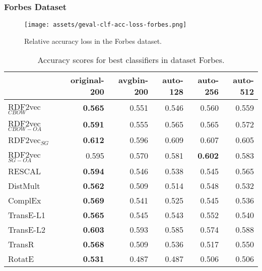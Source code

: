 \documentclass[11pt,titlepage,oneside,openany]{book}
\begin{document}
\newpage

\subsubsection{Forbes Dataset}
\label{subsubsec:geval-results-clf-forbes}


\begin{figure}[H]
    \centering
    \texttt{[image: assets/geval-clf-acc-loss-forbes.png]}
    \vspace*{-3mm}
    \caption{Relative accuracy loss in the Forbes dataset.}
    \label{fig:geval-clf-acc-loss-forbes}
\end{figure}


\begin{table}[H]
\centering
\begin{tabular}{lrrrrr}
\toprule
{} &  original-200 &  avgbin-200 &  auto-128 &  auto-256 &  auto-512 \\
\midrule
RDF2vec$_{CBOW}$     &	\textbf{0.565} &       0.551  &     0.546  &     0.560  &     0.559  \\
RDF2vec$_{CBOW-OA}$  &	\textbf{0.591} &       0.555  &     0.565  &     0.565  &     0.572  \\
RDF2vec$_{SG}$       &	\textbf{0.612} &       0.596  &     0.609  &     0.607  &     0.605  \\
RDF2vec$_{SG-OA}$    &         0.595  &       0.570  &     0.581  &	\textbf{0.602} &     0.583  \\
RESCAL               &	\textbf{0.594} &       0.546  &     0.538  &     0.545  &     0.565  \\
DistMult             &	\textbf{0.562} &       0.509  &     0.514  &     0.548  &     0.532  \\
ComplEx              &	\textbf{0.569} &       0.541  &     0.525  &     0.545  &     0.536  \\
TransE-L1            &	\textbf{0.565} &       0.545  &     0.543  &     0.552  &     0.540  \\
TransE-L2            &	\textbf{0.603} &       0.593  &     0.585  &     0.574  &     0.588  \\
TransR               &	\textbf{0.568} &       0.509  &     0.536  &     0.517  &     0.550  \\
RotatE               &	\textbf{0.531} &       0.487  &     0.487  &     0.506  &     0.506  \\
\bottomrule
\end{tabular}
\caption{Accuracy scores for best classifiers in dataset Forbes.}
\label{tab:geval-clf-acc-forbes}
\end{table}
\end{document}
